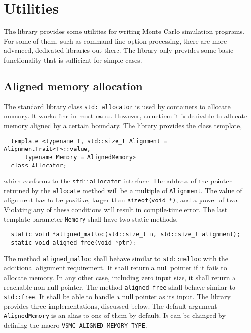 \chapter{Utilities}
\label{chap:Utilities}

The library provides some utilities for writing Monte Carlo simulation
programs. For some of them, such as command line option processing, there are
more advanced, dedicated libraries out there. The library only provides some
basic functionality that is sufficient for simple cases.

\section{Aligned memory allocation}
\label{sec:Aligned memory allocation}

The standard library class \verb|std::allocator| is used by containers to
allocate memory. It works fine in most cases. However, sometime it is desirable
to allocate memory aligned by a certain boundary. The library provides the
class template,
\begin{Verbatim}
  template <typename T, std::size_t Alignment = AlignmentTrait<T>::value,
      typename Memory = AlignedMemory>
  class Allocator;
\end{Verbatim}
which conforms to the \verb|std::allocator| interface. The address of the
pointer returned by the \verb|allocate| method will be a multiple of
\verb|Alignment|. The value of alignment has to be positive, larger than
\verb|sizeof(void *)|, and a power of two. Violating any of these conditions
will result in compile-time error. The last template parameter \verb|Memory|
shall have two static methods,
\begin{Verbatim}
  static void *aligned_malloc(std::size_t n, std::size_t alignment);
  static void aligned_free(void *ptr);
\end{Verbatim}
The method \verb|aligned_malloc| shall behave similar to \verb|std::malloc|
with the additional alignment requirement. It shall return a null pointer if it
fails to allocate memory. In any other case, including zero input size, it
shall return a reachable non-null pointer. The method \verb|aligned_free| shall
behave similar to \verb|std::free|. It shall be able to handle a null pointer
as its input. The library provides three implementations, discussed below. The
default argument \verb|AlignedMemory| is an alias to one of them by default. It
can be changed by defining the macro \verb|VSMC_ALIGNED_MEMORY_TYPE|.

